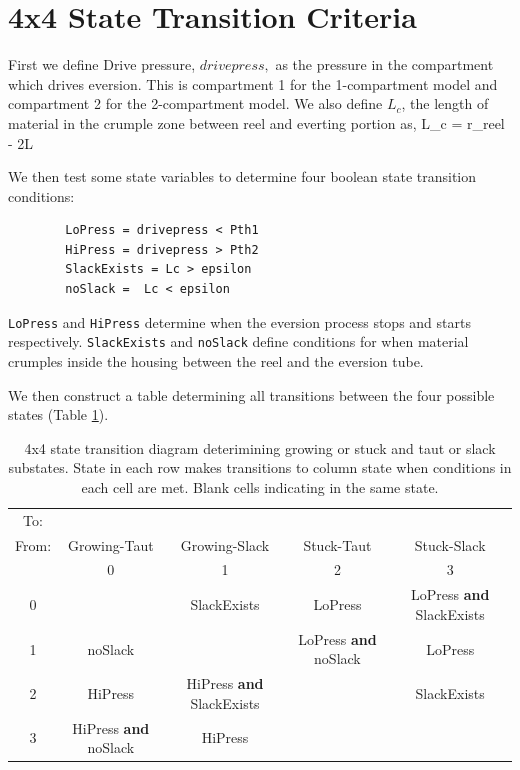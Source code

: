 \documentclass[letterpaper]{article}
\begin{document}
\setpagewiselinenumbers        %
\modulolinenumbers[1]          %



\date{\today}

\section*{4x4 State Transition Criteria}
First we define Drive pressure, $drivepress,$
as the pressure in the compartment which drives eversion.
This is compartment 1 for the 1-compartment model and compartment 2 for the 2-compartment
model.  We also define
$L_c$, the length of material in the crumple zone between reel and everting
portion as,
\beq
L_c = \theta r_{reel} - 2L
\eeq

We then test some state variables to determine four boolean
state transition  conditions:
\begin{verbatim}
        LoPress = drivepress < Pth1
        HiPress = drivepress > Pth2
        SlackExists = Lc > epsilon
        noSlack =  Lc < epsilon
\end{verbatim}

\texttt{LoPress} and \texttt{HiPress} determine when the eversion process stops and starts
respectively. \texttt{SlackExists} and \texttt{noSlack} define conditions for when
material crumples inside the housing between the reel and the eversion tube.

We then construct a table determining all transitions between the four possible states
(Table \ref{4x4stateTable}).


\begin{table}[h]
\begin{tabular}{c|c|c|c|c}
 To: \\From: &  Growing-Taut   & Growing-Slack   & Stuck-Taut  & Stuck-Slack \\ \hline
             &     0  & 1 & 2 & 3 \\ \hline
0    &  & SlackExists & LoPress  & LoPress {\bf and} SlackExists \\ \hline
1    & noSlack  &   & LoPress \textbf{and} noSlack  &  LoPress \\ \hline
2    & HiPress    & HiPress \textbf{and} SlackExists &   &  SlackExists \\ \hline
3    & HiPress \textbf{and} noSlack & HiPress &   & \\
\end{tabular}\caption{4x4 state transition diagram deterimining growing or stuck and
taut or slack substates.  State in each row makes transitions to
column state when conditions
in each cell are met. Blank cells indicating in the same state.}\label{4x4stateTable}
\end{table}
\end{document}

